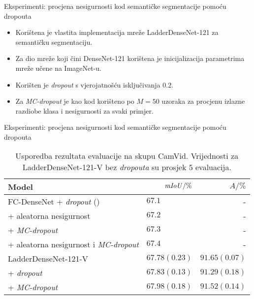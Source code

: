 \documentclass{beamer}
\begin{document}
\begin{frame}{Eksperimenti: procjena nesigurnosti kod semantičke segmentacije pomoću dropouta}
\begin{itemize}
	\item Korištena je vlastita implementacija mreže LadderDenseNet-121 za semantičku segmentaciju. 
	\item Za dio mreže koji čini DenseNet-121 korištena je inicijalizacija parametrima mreže učene na ImageNet-u.
	\item Korišten je \textit{dropout} s vjerojatnošću isključivanja $0.2$.
	\item Za \textit{MC-dropout} je kao kod \citet{Kendall:2017:WUNBDLCV} korišteno po $M=50$ uzoraka za procjenu izlazne razdiobe klasa i nesigurnosti za svaki primjer.	
\end{itemize}
\end{frame}

\begin{frame}{Eksperimenti: procjena nesigurnosti kod semantičke segmentacije pomoću dropouta}
	\begin{table}
		\centering\footnotesize
		\begin{tabular}{lrr}
			\toprule
			\bfseries Model & $\mathit{mIoU}/\%$ & $A/\%$ \\
			\midrule
			FC-DenseNet + \textit{dropout} (\citet{Kendall:2017:WUNBDLCV}) & $67.1\phantom{0(0.00)}$ & - \\
			+ aleatorna nesigurnost & $67.2\phantom{0(0.00)}$ & - \\
			+ \textit{MC-dropout} & $67.3\phantom{0(0.00)}$ & -  \\
			+ aleatorna nesigurnost i \textit{MC-dropout} & $67.4\phantom{0(0.00)}$ & -\\
			\midrule
			LadderDenseNet-121-V & $67.78(0.23)$ & $91.65(0.07)$ \\
			+ \textit{dropout} & $67.83(0.13)$ & $91.29(0.18)$ \\
			+ \textit{MC-dropout} & $67.98(0.18)$ & $91.52(0.14)$
			\\\bottomrule
		\end{tabular}
		\caption{Usporedba rezultata evaluacije na skupu CamVid. Vrijednosti za LadderDenseNet-121-V bez \textit{dropouta} su prosjek $5$ evaluacija.}
		\label{tab:evaluacija-camvid}
	\end{table}
\end{frame}
\end{document}
